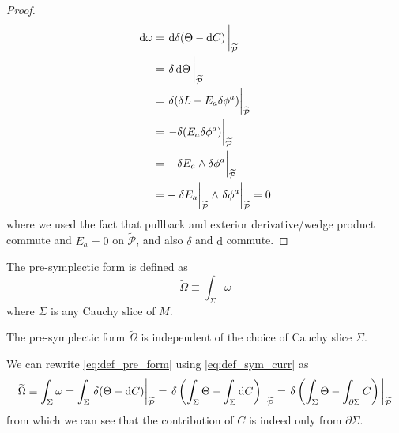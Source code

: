 \documentclass[10pt]{article}
\begin{document}
\begin{proof}
    \begin{equation}
        \begin{split}
            \dd{\omega}&=\eval{\dd{\delta(\Theta-\dd{C})}}_{\widetilde{\mathcal{P}}}\\
                       &=\eval{\delta\dd{\Theta}}_{\widetilde{\mathcal{P}}}\\
                       &=\eval{\delta(\delta L-E_a\delta\phi^a)}_{\widetilde{\mathcal{P}}}\\
                       &=\eval{-\delta( E_a\delta\phi^a)}_{\widetilde{\mathcal{P}}}\\
                       &=\eval{-\delta E_a\wedge\delta\phi^a}_{\widetilde{\mathcal{P}}}\\
                       &=-\eval{\delta E_a}_{\widetilde{\mathcal{P}}}\wedge\eval{\delta\phi^a}_{\widetilde{\mathcal{P}}}=0
        \end{split}
    \end{equation}
    where we used the fact that pullback and exterior derivative/wedge product commute and $E_a=0$ on $\widetilde{\mathcal{P}}$, and also $\delta$ and $\mathrm{d}$ commute.
\end{proof}

\begin{definition}\label{def:Pre-symplectic-form}
    The pre-symplectic form is defined as
    \begin{equation}
        \widetilde{\Omega}\equiv\int_\Sigma \omega\label{eq:def_pre_form}
    \end{equation}
    where $\Sigma$ is any Cauchy slice of $M$.
\end{definition}
\begin{claim}
    The pre-symplectic form $\widetilde{\Omega}$ is independent of the choice of Cauchy slice $\Sigma$.
\end{claim}
We can rewrite \cref{eq:def_pre_form} using \cref{eq:def_sym_curr} as 
\begin{equation}
    \widetilde{\Omega}\equiv\int_\Sigma \omega=\int_\Sigma \eval{\delta(\Theta-\dd{C})}_{\widetilde{\mathcal{P}}}=\eval{\delta\left(\int_\Sigma\Theta-\int_\Sigma\dd{C}\right)}_{\widetilde{\mathcal{P}}}=\eval{\delta\left(\int_\Sigma\Theta-\int_{\partial\Sigma}C\right)}_{\widetilde{\mathcal{P}}}
\end{equation}
from which we can see that the contribution of $C$ is indeed only from $\partial\Sigma$.
\end{document}
